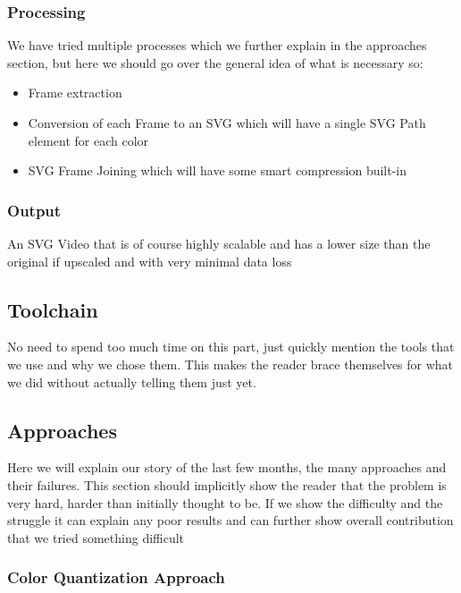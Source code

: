 \documentclass[12pt]{article}
\begin{document}
    \subsubsection{Processing}

    We have tried multiple processes which we further explain in the approaches section, but here
    we should go over the general idea of what is necessary so:
    \begin{itemize}
        \item Frame extraction
        \item Conversion of each Frame to an SVG which will have a single SVG Path element for each color
        \item SVG Frame Joining which will have some smart compression built-in
    \end{itemize}

    \subsubsection{Output}

    An SVG Video that is of course highly scalable and has a lower size than the original if upscaled and with
    very minimal data loss

    \subsection{Toolchain}

    No need to spend too much time on this part, just quickly mention the tools that we use and why we chose them.
    This makes the reader brace themselves for what we did without actually telling them just yet.

    \subsection{Approaches}

    Here we will explain our story of the last few months, the many approaches and their failures. This section
    should implicitly show the reader that the problem is very hard, harder than initially thought to be. If
    we show the difficulty and the struggle it can explain any poor results and can further show overall contribution
    that we tried something difficult

    \subsubsection{Color Quantization Approach}
\end{document}
